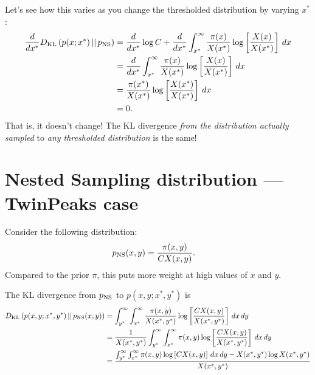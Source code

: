 \documentclass[a4paper, 12pt]{article}
\begin{document}
Let's see how this varies as you change the thresholded distribution
by varying $x^*$:
\begin{align}
\frac{d}{dx^*} D_{\rm KL}\left(p(x; x^*) \,||\, p_{\rm NS}\right)
    &= \frac{d}{dx^*} \log C +
        \frac{d}{dx^*}\int_{x^*}^{\infty} \frac{\pi(x)}{X(x^*)}
            \log \left[\frac{X(x)}{X(x^*)}\right] \, dx \\
    &= \frac{d}{dx^*}\int_{x^*}^{\infty} \frac{\pi(x)}{X(x^*)}
            \log \left[\frac{X(x)}{X(x^*)}\right] \, dx \\
    &= \frac{\pi(x^*)}{X(x^*)}
            \log \left[\frac{X(x^*)}{X(x^*)}\right] \, dx \\
    &= 0.
\end{align}
That is, it doesn't change! The KL divergence
{\em from the distribution actually sampled} to
{\em any thresholded distribution} is the same!




\section{Nested Sampling distribution --- TwinPeaks case}

Consider the following distribution:
\begin{align}
p_{\rm NS}(x, y) &= \frac{\pi(x, y)}{C X(x, y)}.
\end{align}
Compared to the prior $\pi$, this puts more weight at high values of
$x$ and $y$.

The KL divergence from $p_{\rm NS}$ to $p(x, y ; x^*, y^*)$ is
\begin{align}
D_{\rm KL}\left(p(x, y; x^*, y^*) \,||\, p_{\rm NS}(x, y)\right)
&=
\int_{y^*}^{\infty} \int_{x^*}^{\infty}
    \frac{\pi(x, y)}{X(x^*, y^*)}
    \log \left[\frac{C X(x, y)}{X(x^*, y^*)}\right]
    \, dx \, dy \\
&=
\frac{1}{X(x^*, y^*)}
\int_{y^*}^{\infty} \int_{x^*}^{\infty}
    \pi(x, y)
    \log \left[\frac{C X(x, y)}{X(x^*, y^*)}\right]
    \, dx \, dy \\
&=
\frac{\int_{y^*}^{\infty} \int_{x^*}^{\infty}
     \pi(x, y)
     \log \left[C X(x, y)\right]
     \, dx \, dy - X(x^*, y^*)\log X(x^*, y^*)}
     {X(x^*, y^*)}
\end{align}
\end{document}
